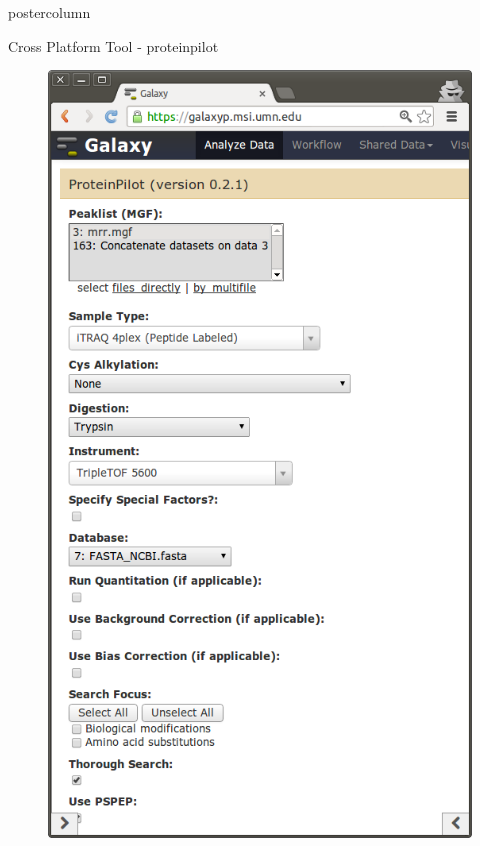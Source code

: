 \documentclass[final]{beamer}
\begin{document}
\begin{frame}
\begin{columns}
\begin{column}{.33\textwidth}
\begin{beamercolorbox}[center,wd=\textwidth]{postercolumn}
\begin{minipage}[T]{.95\textwidth}
{\begin{block}{Cross Platform Tool - proteinpilot}
\begin{figure}
                \includegraphics[scale=0.5]{proteinpilot_screenshot.png}
              \end{figure}
            \end{block}
            \vfill
          }
        \end{minipage}
      \end{beamercolorbox}
    \end{column}              



  \end{columns}   
\end{frame}
\end{document}
